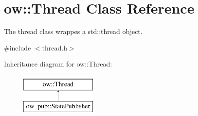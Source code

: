 \hypertarget{classow_1_1Thread}{}\section{ow\+:\+:Thread Class Reference}
\label{classow_1_1Thread}


The thread class wrappes a std\+::thread object.  




{\ttfamily \#include $<$thread.\+h$>$}

Inheritance diagram for ow\+:\+:Thread\+:\begin{figure}[H]
\begin{center}
\leavevmode
\includegraphics[height=2.000000cm]{d9/dac/classow_1_1Thread}
\end{center}
\end{figure}
